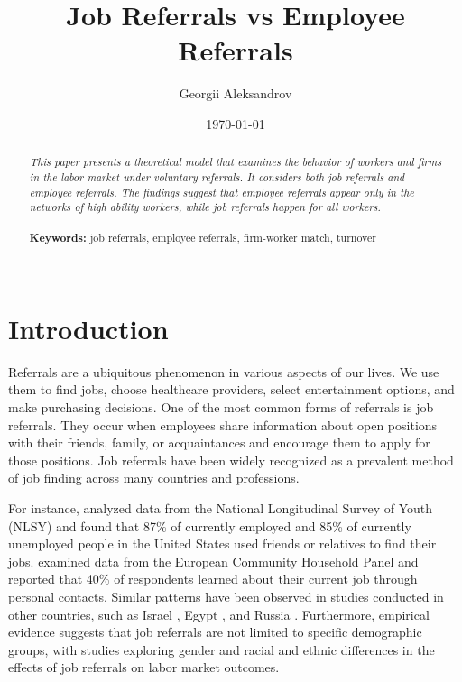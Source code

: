 \documentclass[12pt]{article}
\begin{document}
\begin{titlepage}
\title{Job Referrals vs Employee Referrals}%
\author{Georgii Aleksandrov}%
\date{\today}
\maketitle
\begin{abstract}
\noindent \textit{This paper presents a theoretical model that examines the behavior of workers and firms in the labor market under voluntary referrals. It considers both job referrals and employee referrals. The findings suggest that employee referrals appear only in the networks of high ability workers, while job referrals happen for all workers.}\\
\vspace{0in}\\
\noindent\textbf{Keywords:} job referrals, employee referrals, firm-worker match, turnover\\
\vspace{0in}\\

\bigskip
\end{abstract}
\setcounter{page}{0}
\thispagestyle{empty}
\end{titlepage}
\pagebreak \newpage




\doublespacing


\section{Introduction} \label{sec:introduction}
Referrals are a ubiquitous phenomenon in various aspects of our lives. We use them to find jobs, choose healthcare providers, select entertainment options, and make purchasing decisions. One of the most common forms of referrals is job referrals. They occur when employees share information about open positions with their friends, family, or acquaintances and encourage them to apply for those positions. Job referrals have been widely recognized as a prevalent method of job finding across many countries and professions. 

For instance, \cite{holzer1987job} analyzed data from the National Longitudinal Survey of Youth (NLSY) and found that 87\% of currently employed and 85\% of currently unemployed people in the United States used friends or relatives to find their jobs. \cite{pellizzari2010friends} examined data from the European Community Household Panel and reported that 40\% of respondents learned about their current job through personal contacts. Similar patterns have been observed in studies conducted in other countries, such as Israel \citep{alon1997job}, Egypt \citep{wahba2005density}, and Russia \citep{yakubovich2005weak}. Furthermore, empirical evidence suggests that job referrals are not limited to specific demographic groups, with studies exploring gender \citep{corcoran1980most, morrison1990women, lalanne2016old} and racial and ethnic differences \citep{datcher1983impact, green1999racial, loury2006some} in the effects of job referrals on labor market outcomes.
\end{document}
